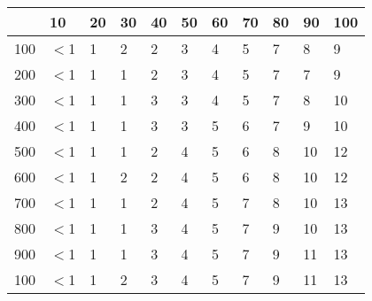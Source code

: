 \documentclass{article}
\begin{document}
\begin{center}
\begin{table}
\begin{tabularx}{0.8\textwidth}{|X|X|X|X|X|X|X|X|X|X|X|}
\hline &10&20&30&40&50&60&70&80&90&100\\
\hline 100&$<$1&1&2&2&3&4&5&7&8&9\\
\hline 200&$<$1&1&1&2&3&4&5&7&7&9\\
\hline 300&$<$1&1&1&3&3&4&5&7&8&10\\
\hline 400&$<$1&1&1&3&3&5&6&7&9&10\\
\hline 500&$<$1&1&1&2&4&5&6&8&10&12\\
\hline 600&$<$1&1&2&2&4&5&6&8&10&12\\
\hline 700&$<$1&1&1&2&4&5&7&8&10&13\\
\hline 800&$<$1&1&1&3&4&5&7&9&10&13\\
\hline 900&$<$1&1&1&3&4&5&7&9&11&13\\
\hline 100&$<$1&1&2&3&4&5&7&9&11&13\\
\hline
\end{tabularx}
\end{table}
\end{center}
\end{document}
